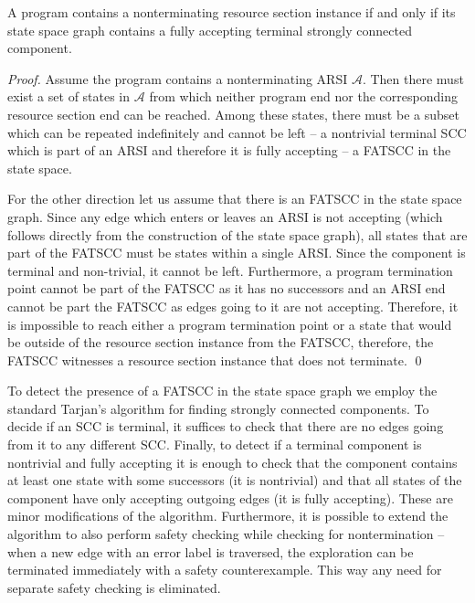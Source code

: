 \begin{theorem}\label{thm:lnterm}
    A program contains a nonterminating resource section instance if and only if
    its state space graph contains a fully accepting terminal strongly connected component.
\end{theorem}
\begin{proof}
    Assume the program contains a nonterminating ARSI $\mathcal{A}$.
    Then there must exist a set of states in $\mathcal{A}$ from which neither program end nor the corresponding resource section end can be reached.
    Among these states, there must be a subset which can be repeated
    indefinitely and cannot be left -- a nontrivial terminal SCC which is part
    of an ARSI and therefore it is fully accepting -- a FATSCC in the state space.

    For the other direction let us assume that there is an FATSCC in the state
    space graph. Since any edge which enters or leaves an ARSI is not accepting
    (which follows directly from the construction of the state space graph), all
    states that are part of the FATSCC must be states within a single
    ARSI. Since the component is terminal and non-trivial, it cannot be left.
    Furthermore, a program termination point cannot be part of the FATSCC as it
    has no successors and an ARSI end cannot be part the FATSCC as edges going to
    it are not accepting. Therefore, it is impossible to reach either a program
    termination point or a state that would be outside of the resource section
    instance from the FATSCC, therefore, the FATSCC witnesses a resource section
    instance that does not terminate. \qed
\end{proof}

To detect the presence of a FATSCC in the state space graph we employ the
standard Tarjan's algorithm for finding strongly connected components.
To decide if an SCC is terminal, it suffices to check that there are no
edges going from it to any different SCC. Finally, to detect if a terminal
component is nontrivial and fully accepting it is enough to check that the
component contains at least one state with some successors (it is nontrivial) and
that all states of the component have only accepting outgoing edges (it is fully
accepting). These are minor modifications of the algorithm.
Furthermore, it is possible to extend the algorithm to also perform safety
checking while checking for nontermination -- when a new edge with an error label
is traversed, the exploration can be terminated immediately with a safety
counterexample.
This way any need for separate safety checking is eliminated.

